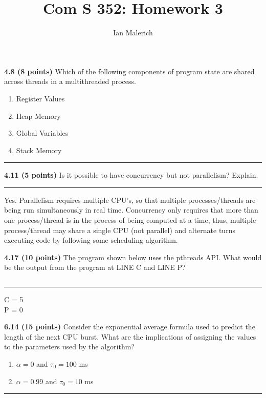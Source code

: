 \documentclass[12pt]{jhwhw}
\author{Ian Malerich}
\title{Com S 352: Homework 3}
\begin{document}
\raggedright

\textbf{4.8 (8 points)}  Which of the following components of program state are 
	shared across threads in a multithreaded process.
	\begin{enumerate}
		\item Register Values
		\item Heap Memory
		\item Global Variables
		\item Stack Memory
	\end{enumerate}
\textcolor[RGB]{240,240,240}{\rule{\textwidth}{0.5pt}}\bigbreak

	\begin{addmargin}[1em]{}
	\end{addmargin}

\textbf{4.11 (5 points)} Is it possible to have concurrency but not parallelism?
	Explain.
\textcolor[RGB]{240,240,240}{\rule{\textwidth}{0.5pt}}\bigbreak

	\begin{addmargin}[1em]{}
		Yes. Parallelism requires multiple CPU's, so that multiple processes/threads
		are being run simultaneously in real time. Concurrency only requires that more
		than one process/thread is in the process of being computed at a time, thus,
		multiple process/thread may share a single CPU (not parallel) and alternate
		turns executing code by following some scheduling algorithm.
	\end{addmargin}
	\bigbreak

\textbf{4.17 (10 points)} The program shown below uses the pthreads API. 
	What would be the output from the program at LINE C and LINE P?
\inputminted{c}{4.17.c}
\textcolor[RGB]{240,240,240}{\rule{\textwidth}{0.5pt}}\bigbreak

	\begin{addmargin}[1em]{}
		C = 5 \\
		P = 0 \\
	\end{addmargin}

\textbf{6.14 (15 points)} Consider the exponential average formula used to
	predict the length of the next CPU burst. What are the implications of assigning
	the values to the parameters used by the algorithm?
	\begin{enumerate}
		\item $\alpha=0$ and $\tau_0=100$ ms
		\item $\alpha=0.99$ and $\tau_ 0=10$ ms
	\end{enumerate}
\textcolor[RGB]{240,240,240}{\rule{\textwidth}{0.5pt}}\bigbreak
\end{document}

